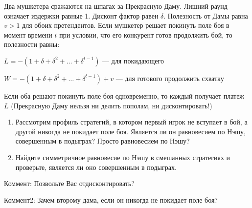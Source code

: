 \begin{problem}
 Два мушкетера сражаются на шпагах за Прекрасную Даму. Лишний раунд
означает издержки равные 1. Дисконт фактор равен $\delta$.
Полезность от Дамы равна $v>1$ для обоих претендентов. Если мушкетер
решает покинуть поле боя в момент времени $t$ при условии, что его
конкурент готов продолжить бой, то полезности равны: \par
$L=-(1+\delta+\delta^{2}+\ldots +\delta^{t-1})$ --- для покидающего \par
$W=-(1+\delta+\delta^{2}+\ldots +\delta^{t-1})+v$ --- для готового
продолжить схватку \par
Если оба решают покинуть поле боя одновременно, то каждый получает
платеж $L$ (Прекрасную Даму нельзя ни делить пополам, ни дисконтировать!) \par
\begin{enumerate}
\item  Рассмотрим профиль стратегий, в котором первый игрок не
вступает в бой, а другой никогда не покидает поле боя. Является ли
он равновесием по Нэшу, совершенным в подыграх? Просто равновесием
по Нэшу? \par
\item Найдите симметричное равновесие по Нэшу в смешанных стратегиях
и проверьте, является ли оно совершенным в подыграх.
\end{enumerate}
\begin{rem}
Коммент: Позвольте Вас отдисконтировать?

Коммент2: Зачем второму дама, если он никогда не покидает поле боя?
\end{rem}


\begin{sol}

\end{sol}
\end{problem}




